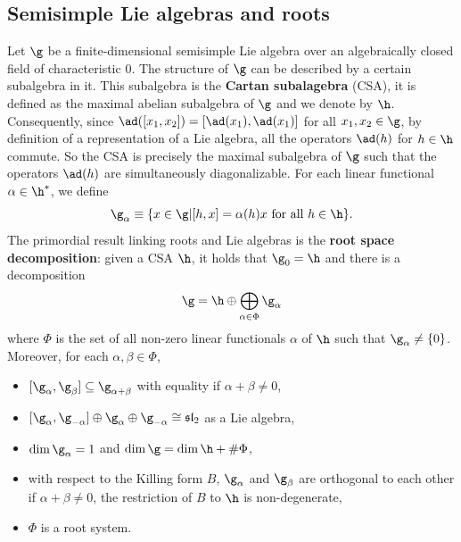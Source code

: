 \documentclass{worksheetclass}
\renewcommand{\emph}{\textbf}
\begin{document}
    \subsection{Semisimple Lie algebras and roots}

        Let $\g$ be a finite-dimensional semisimple Lie algebra over an algebraically closed field of characteristic $0$. The structure of $\g$ can be described by a certain subalgebra in it. This subalgebra is the \emph{Cartan subalagebra} (CSA), it is defined as the maximal abelian subalgebra of $\g$ and we denote by $\h$. Consequently, since $\ad([x_1,x_2])=[\ad(x_1),\ad(x_1)]$ for all $x_1,x_2\in\g$, by definition of a representation of a Lie algebra, all the operators $\ad(h)$ for $h\in\h$ commute. So the CSA is precisely the maximal subalgebra of $\g$ such that the operators $\ad(h)$ are simultaneously diagonalizable. For each linear functional $\alpha\in\h^*$, we define
        \begin{equation}
            \g_\alpha\equiv \{x\in\g|[h,x]=\alpha(h)x\text{ for all }h\in\h\}.
        \end{equation}
        The primordial result linking roots and Lie algebras is the \emph{root space decomposition}: given a CSA $\h$, it holds that $\g_0=\h$ and there is a decomposition
        \begin{equation}
            \g=\h\oplus\bigoplus_{\alpha\in\Phi}\g_\alpha
        \end{equation}
        where $\Phi$ is the set of all non-zero linear functionals $\alpha$ of $\h$ such that $\g_\alpha\neq\{0\}$. Moreover, for each $\alpha,\beta\in\Phi$,
        \begin{itemize}
            \item $[\g_\alpha,\g_\beta]\subseteq\g_{\alpha+\beta}$ with equality if $\alpha+\beta\neq0$,
            \item $[\g_\alpha,\g_{-\alpha}]\oplus\g_\alpha\oplus\g_{-\alpha}\cong\mathfrak{sl}_2$ as a Lie algebra,
            \item $\dim\g_\alpha=1$ and $\dim\g=\dim\h+\#\Phi$,
            \item with respect to the Killing form $B$, $\g_\alpha$ and $\g_\beta$ are orthogonal to each other if $\alpha+\beta\neq0$, the restriction of $B$ to $\h$ is non-degenerate,
            \item $\Phi$ is a root system.
        \end{itemize}
        
\end{document}
